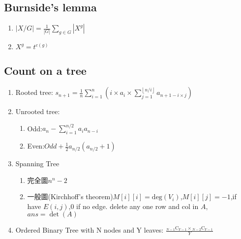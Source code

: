 \subsection{Burnside's lemma}
\begin{enumerate}\itemsep = -3pt
	\item $|X/G| = \frac{1}{|G|}\sum_{g \in G}|X^g|$
	\item $X^g=t^{c(g)}$
\end{enumerate}
\subsection{Count on a tree}
\begin{enumerate}\itemsep = -3pt
	\item Rooted tree: $s_{n+1}=\frac{1}{n}\sum_{i=1}^{n}(i\times a_i\times \sum_{j=1}^{\left \lfloor  n/i\right \rfloor} a_{n+1-i\times j})$
	\item Unrooted tree: 
	\begin{enumerate}\itemsep = -2pt
		\item Odd:$a_n-\sum_{i=1}^{n/2}a_ia_{n-i}$
		\item Even:$Odd+\frac{1}{2}a_{n/2}(a_{n/2}+1)$
	\end{enumerate}
	\item Spanning Tree
	\begin{enumerate}\itemsep = -2pt
		\item 完全圖$n^n-2$
		\item 一般圖(Kirchhoff's theorem)$M[i][i]=\text{deg}(V_i)$,$M[i][j]=-1$,if have $E(i,j)$,$0$ if no edge. delete any one row and col in $A$, $ans = \det(A)$
	\end{enumerate}
	\item Ordered Binary Tree with N nodes and Y leaves: $\frac{{}_{N - 1} \mathrm{C} _{Y - 1} \times {}_{N - 2} \mathrm{C} _{Y - 1}}{Y}$
\end{enumerate}

%
